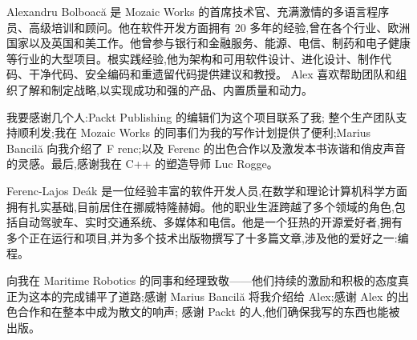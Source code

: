 ﻿Alexandru Bolboacă 是 Mozaic Works 的首席技术官、充满激情的多语言程序员、高级培训和顾问。他在软件开发方面拥有 20 多年的经验,曾在各个行业、欧洲国家以及英国和美工作。他曾参与银行和金融服务、能源、电信、制药和电子健康等行业的大型项目。根实践经验,他为架构和可用软件设计、进化设计、制作代码、干净代码、安全编码和重遗留代码提供建议和教授。 Alex 喜欢帮助团队和组织了解和制定战略,以实现成功和强的产品、内置质量和动力。

我要感谢几个人:Packt Publishing 的编辑们为这个项目联系了我; 整个生产团队支持顺利发;我在 Mozaic Works 的同事们为我的写作计划提供了便利;Marius Bancilă 向我介绍了 F renc;以及 Ferenc 的出色合作以及激发本书诙谐和俏皮声音的灵感。最后,感谢我在 C++ 的塑造导师 Luc Rogge。

Ferenc-Lajos Deák 是一位经验丰富的软件开发人员,在数学和理论计算机科学方面拥有扎实基础,目前居住在挪威特隆赫姆。他的职业生涯跨越了多个领域的角色,包括自动驾驶车、实时交通系统、多媒体和电信。他是一个狂热的开源爱好者,拥有多个正在运行和项目,并为多个技术出版物撰写了十多篇文章,涉及他的爱好之一:编程。

向我在 Maritime Robotics 的同事和经理致敬——他们持续的激励和积极的态度真正为这本的完成铺平了道路;感谢 Marius Bancilă 将我介绍给 Alex;感谢 Alex 的出色合作和在整本中成为散文的响声; 感谢 Packt 的人,他们确保我写的东西也能被出版。